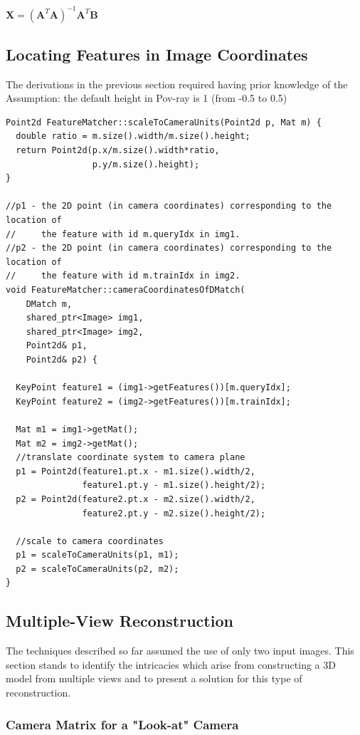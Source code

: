 \documentclass[12pt,a4paper,twoside,openright]{report}
\begin{document}
\begin{center}
$\mathbf{X} = (\mathbf{A}^{T} \mathbf{A})^{-1} \mathbf{A}^{T} \mathbf{B}$
\end{center}

\subsection{Locating Features in Image Coordinates}
The derivations in the previous section required having prior knowledge of the 
Assumption: the default height in Pov-ray is 1 (from -0.5 to 0.5)
\begin{verbatim}
Point2d FeatureMatcher::scaleToCameraUnits(Point2d p, Mat m) {
  double ratio = m.size().width/m.size().height;
  return Point2d(p.x/m.size().width*ratio,
                 p.y/m.size().height);
}

//p1 - the 2D point (in camera coordinates) corresponding to the location of
//     the feature with id m.queryIdx in img1.
//p2 - the 2D point (in camera coordinates) corresponding to the location of
//     the feature with id m.trainIdx in img2.
void FeatureMatcher::cameraCoordinatesOfDMatch(
    DMatch m,
    shared_ptr<Image> img1,
    shared_ptr<Image> img2,
    Point2d& p1,
    Point2d& p2) {

  KeyPoint feature1 = (img1->getFeatures())[m.queryIdx];
  KeyPoint feature2 = (img2->getFeatures())[m.trainIdx];

  Mat m1 = img1->getMat();
  Mat m2 = img2->getMat();
  //translate coordinate system to camera plane
  p1 = Point2d(feature1.pt.x - m1.size().width/2,
               feature1.pt.y - m1.size().height/2);
  p2 = Point2d(feature2.pt.x - m2.size().width/2,
               feature2.pt.y - m2.size().height/2);

  //scale to camera coordinates
  p1 = scaleToCameraUnits(p1, m1);
  p2 = scaleToCameraUnits(p2, m2);
}

\end{verbatim}



\subsection{Multiple-View Reconstruction}
The techniques described so far assumed the use of only two input images. This section stands to identify the intricacies which arise from constructing a 3D model from multiple views and to present a solution for this type of reconstruction.
\subsubsection{Camera Matrix for a "Look-at" Camera}
\end{document}
